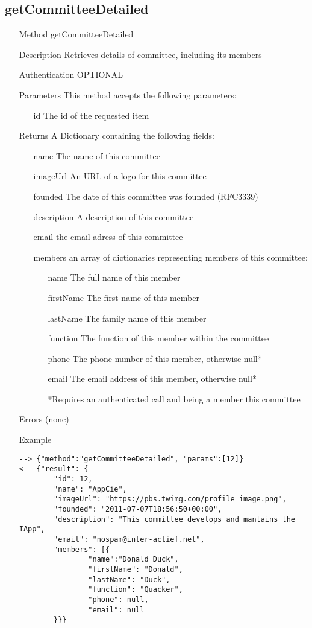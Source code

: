 \documentclass[a4paper]{scrreprt}
\begin{document}
\subsection{getCommitteeDetailed}
\begin{enumerate}
\item[Method] getCommitteeDetailed
\item[Description] Retrieves details of committee, including its members
\item[Authentication] OPTIONAL
\item[Parameters] This method accepts the following parameters:
\begin{enumerate}
	\item[id] The id of the requested item
    \end{enumerate}
\item[Returns] A Dictionary containing the following fields:
\begin{enumerate}
    \item[name] The name of this committee
    \item[imageUrl] An URL of a logo for this committee
    \item[founded] The  date of this committee was founded (RFC3339)
    \item[description] A description of this committee
    \item[email] the email adress of this committee
    \item[members] an array of dictionaries representing members of this committee:
	\begin{enumerate}
        \item[name] The full name of this member
        \item[firstName] The first name of this member
        \item[lastName] The family name of this member
        \item[function] The function of this member within the committee
        \item[phone] The phone number of this member, otherwise null*
        \item[email] The email address of this member, otherwise null*
        \item[] *Requires an authenticated call and being a member this committee
        \end{enumerate}
	\end{enumerate}
\item[Errors] (none)
\item[Example]
\begin{lstlisting}
--> {"method":"getCommitteeDetailed", "params":[12]}
<-- {"result": {
        "id": 12,
        "name": "AppCie",
        "imageUrl": "https://pbs.twimg.com/profile_image.png",
        "founded": "2011-07-07T18:56:50+00:00",
        "description": "This committee develops and mantains the IApp",
        "email": "nospam@inter-actief.net",
        "members": [{
            	"name":"Donald Duck",
                "firstName": "Donald",
                "lastName": "Duck",
                "function": "Quacker",
                "phone": null,
                "email": null
        }}}
\end{lstlisting}
\end{enumerate}
\end{document}
